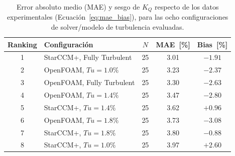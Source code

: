 \begin{table}[htpb]
\centering
\caption{Error absoluto medio (MAE) y sesgo de $K_Q$ respecto de los datos
experimentales (Ecuación~\ref{eq:mae_bias}), para las ocho configuraciones de
solver/modelo de turbulencia evaluadas.}
\label{tab:mae_kq_coreana}
\begin{tabular}{clccc}
\hline
Ranking & Configuración & $N$ & MAE~[\%] & Bias~[\%] \\
\hline
1 & StarCCM+, Fully Turbulent   & 25 & 3.01 & $-1.91$ \\
2 & OpenFOAM, $Tu = 1.0\%$      & 25 & 3.23 & $-2.37$ \\
3 & OpenFOAM, Fully Turbulent   & 25 & 3.30 & $-2.63$ \\
4 & OpenFOAM, $Tu = 1.4\%$      & 25 & 3.47 & $-2.80$ \\
5 & StarCCM+, $Tu = 1.4\%$      & 25 & 3.62 & $+0.96$ \\
6 & OpenFOAM, $Tu = 1.8\%$      & 25 & 3.73 & $-3.08$ \\
7 & StarCCM+, $Tu = 1.8\%$      & 25 & 3.80 & $-0.88$ \\
8 & StarCCM+, $Tu = 1.0\%$      & 25 & 3.97 & $+2.60$ \\
\hline
\end{tabular}
\end{table}

